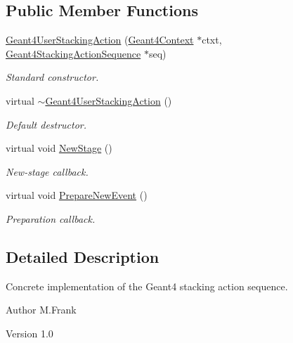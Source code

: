 \subsection*{Public Member Functions}
\begin{DoxyCompactItemize}
\item 
\hyperlink{class_d_d4hep_1_1_simulation_1_1_geant4_user_stacking_action_a34c062c0fa5934878f532ef10f9c96d5}{Geant4UserStackingAction} (\hyperlink{class_d_d4hep_1_1_simulation_1_1_geant4_context}{Geant4Context} $\ast$ctxt, \hyperlink{class_d_d4hep_1_1_simulation_1_1_geant4_stacking_action_sequence}{Geant4StackingActionSequence} $\ast$seq)
\begin{DoxyCompactList}\small\item\em Standard constructor. \item\end{DoxyCompactList}\item 
virtual \hyperlink{class_d_d4hep_1_1_simulation_1_1_geant4_user_stacking_action_a023f102d73420bfab08e6a866ea03dc7}{$\sim$Geant4UserStackingAction} ()
\begin{DoxyCompactList}\small\item\em Default destructor. \item\end{DoxyCompactList}\item 
virtual void \hyperlink{class_d_d4hep_1_1_simulation_1_1_geant4_user_stacking_action_ae8abf4d3f1981b66637e9ceffbc9c604}{NewStage} ()
\begin{DoxyCompactList}\small\item\em New-\/stage callback. \item\end{DoxyCompactList}\item 
virtual void \hyperlink{class_d_d4hep_1_1_simulation_1_1_geant4_user_stacking_action_a565c100df77dc0bdfe343a424285cdab}{PrepareNewEvent} ()
\begin{DoxyCompactList}\small\item\em Preparation callback. \item\end{DoxyCompactList}\end{DoxyCompactItemize}


\subsection{Detailed Description}
Concrete implementation of the Geant4 stacking action sequence. \begin{DoxyAuthor}{Author}
M.Frank 
\end{DoxyAuthor}
\begin{DoxyVersion}{Version}
1.0 
\end{DoxyVersion}


